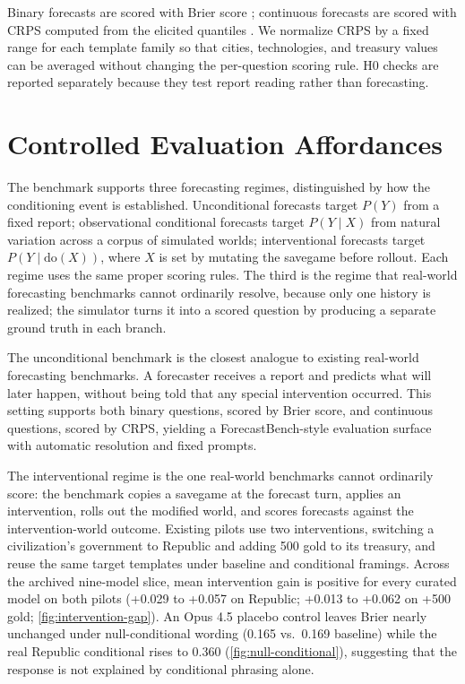 \documentclass{article}
\begin{document}
Binary forecasts are scored with Brier score \citep{brier1950verification}; continuous forecasts are scored with CRPS computed from the elicited quantiles \citep{gneiting2007proper}. We normalize CRPS by a fixed range for each template family so that cities, technologies, and treasury values can be averaged without changing the per-question scoring rule. H0 checks are reported separately because they test report reading rather than forecasting.

\section{Controlled Evaluation Affordances}

The benchmark supports three forecasting regimes, distinguished by how the conditioning event is established. Unconditional forecasts target $P(Y)$ from a fixed report; observational conditional forecasts target $P(Y \mid X)$ from natural variation across a corpus of simulated worlds; interventional forecasts target $P(Y \mid \mathrm{do}(X))$, where $X$ is set by mutating the savegame before rollout. Each regime uses the same proper scoring rules. The third is the regime that real-world forecasting benchmarks cannot ordinarily resolve, because only one history is realized; the simulator turns it into a scored question by producing a separate ground truth in each branch.

The unconditional benchmark is the closest analogue to existing real-world forecasting benchmarks. A forecaster receives a report and predicts what will later happen, without being told that any special intervention occurred. This setting supports both binary questions, scored by Brier score, and continuous questions, scored by CRPS, yielding a ForecastBench-style evaluation surface with automatic resolution and fixed prompts.

The interventional regime is the one real-world benchmarks cannot ordinarily score: the benchmark copies a savegame at the forecast turn, applies an intervention, rolls out the modified world, and scores forecasts against the intervention-world outcome. Existing pilots use two interventions, switching a civilization's government to Republic and adding 500 gold to its treasury, and reuse the same target templates under baseline and conditional framings. Across the archived nine-model slice, mean intervention gain is positive for every curated model on both pilots (+0.029 to +0.057 on Republic; +0.013 to +0.062 on +500 gold; \cref{fig:intervention-gap}). An Opus 4.5 placebo control leaves Brier nearly unchanged under null-conditional wording (0.165 vs.\ 0.169 baseline) while the real Republic conditional rises to 0.360 (\cref{fig:null-conditional}), suggesting that the response is not explained by conditional phrasing alone.
\end{document}
